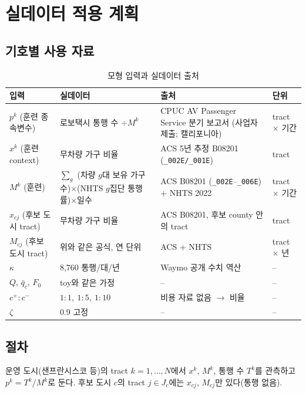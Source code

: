\documentclass[10pt,a4paper]{article}
\begin{document}
\section{실데이터 적용 계획}

\subsection{기호별 사용 자료}

\begin{table}[H]\centering\small
\caption{모형 입력과 실데이터 출처}\label{tab:realdata}
\begin{tabular}{@{}L{0.17\textwidth}L{0.30\textwidth}L{0.33\textwidth}L{0.12\textwidth}@{}}
\toprule
입력 & 실데이터 & 출처 & 단위 \\ \midrule
$p^k$ (훈련 종속변수) & 로보택시 통행 수 $\div M^k$ & CPUC AV Passenger Service 분기 보고서 (사업자 제출; 캘리포니아) & tract $\times$ 기간 \\
$x^k$ (훈련 context) & 무차량 가구 비율 & ACS 5년 추정 B08201 (\texttt{\_002E/\_001E}) & tract \\
$M^k$ (훈련) & $\sum_g$ (차량 $g$대 보유 가구 수)$\times$(NHTS $g$집단 통행률)$\times$일수 & ACS B08201 (\texttt{\_002E}--\texttt{\_006E}) + NHTS 2022 & tract $\times$ 기간 \\
$x_{cj}$ (후보 도시 tract) & 무차량 가구 비율 & ACS B08201, 후보 county 안의 tract & tract \\
$M_{cj}$ (후보 도시 tract) & 위와 같은 공식, 연 단위 & ACS + NHTS & tract $\times$ 년 \\
$\kappa$ & 8{,}760 통행/대/년 & Waymo 공개 수치 역산 & -- \\
$Q$, $\bar q_c$, $F_0$ & toy와 같은 가정 & -- & -- \\
$c^+:c^-$ & $1{:}1,\ 1{:}5,\ 1{:}10$ & 비용 자료 없음 $\to$ 비율 & -- \\
$\zeta$ & 0.9 고정 & -- & -- \\
\bottomrule
\end{tabular}
\end{table}

\subsection{절차}

운영 도시(샌프란시스코 등)의 tract $k=1,\dots,N$에서 $x^k$, $M^k$, 통행 수 $T^k$를 관측하고 $p^k=T^k/M^k$로 둔다. 후보 도시 $c$의 tract $j\in J_c$에는 $x_{cj}$, $M_{cj}$만 있다(통행 없음).
\end{document}
